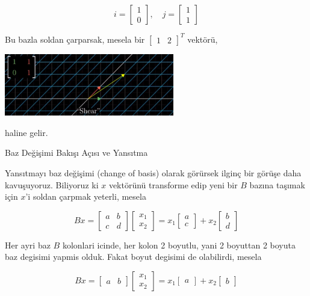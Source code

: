 \documentclass[12pt,fleqn]{article}\usepackage{../../common}
\begin{document}
$$
i = \left[\begin{array}{c}1 \\ 0 \end{array}\right], \quad
j = \left[\begin{array}{c}1 \\ 1 \end{array}\right]
$$

Bu bazla soldan çarparsak, mesela bir $[\begin{array}{cc}1&2\end{array}]^T$ vektörü,

\includegraphics[width=20em]{shear.jpg}

haline gelir.

Baz Değişimi Bakışı Açısı ve Yansıtma

Yansıtmayı baz değişimi (change of basis) olarak görürsek ilginç bir görüşe daha
kavuşuyoruz. Biliyoruz ki $x$ vektörünü transforme edip yeni bir $B$ bazına
taşımak için $x$'i soldan çarpmak yeterli, mesela

$$
Bx = 
\left[\begin{array}{ccc}
a & b \\ c & d
\end{array}\right]
\left[\begin{array}{c}
x_1 \\ x_2
\end{array}\right] =
x_1 \left[\begin{array}{c}
a \\ c
\end{array}\right] +
x_2 \left[\begin{array}{c}
b \\ d
\end{array}\right]
$$

Her ayri baz $B$ kolonlari icinde, her kolon 2 boyutlu, yani 2 boyuttan 2 boyuta
baz degisimi yapmis olduk. Fakat boyut degisimi de olabilirdi, mesela 

$$
Bx = 
\left[\begin{array}{ccc}
a & b 
\end{array}\right]
\left[\begin{array}{c}
x_1 \\ x_2
\end{array}\right] =
x_1 \left[\begin{array}{c}
a 
\end{array}\right] +
x_2 \left[\begin{array}{c}
b 
\end{array}\right]
$$
\end{document}
